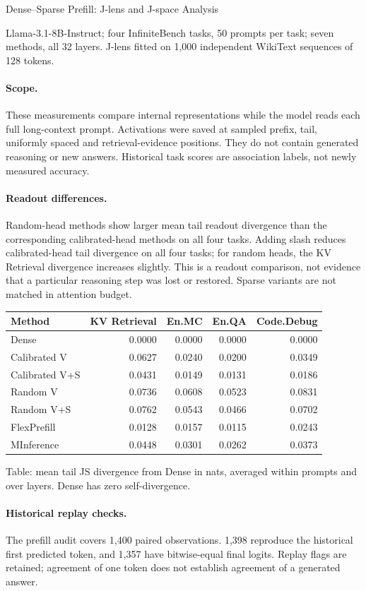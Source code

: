 \documentclass[11pt]{article}
\begin{document}
\begin{center}\Large Dense--Sparse Prefill: J-lens and J-space Analysis\end{center}
\noindent Llama-3.1-8B-Instruct; four InfiniteBench tasks, 50 prompts per task; seven methods, all 32 layers. J-lens fitted on 1,000 independent WikiText sequences of 128 tokens.
\paragraph{Scope.} These measurements compare internal representations while the model reads each full long-context prompt. Activations were saved at sampled prefix, tail, uniformly spaced and retrieval-evidence positions. They do not contain generated reasoning or new answers. Historical task scores are association labels, not newly measured accuracy.
\paragraph{Readout differences.} Random-head methods show larger mean tail readout divergence than the corresponding calibrated-head methods on all four tasks. Adding slash reduces calibrated-head tail divergence on all four tasks; for random heads, the KV Retrieval divergence increases slightly. This is a readout comparison, not evidence that a particular reasoning step was lost or restored. Sparse variants are not matched in attention budget.
\begin{center}\begin{tabular}{lrrrr}\toprule Method & KV Retrieval & En.MC & En.QA & Code.Debug\\\midrule
Dense & 0.0000 & 0.0000 & 0.0000 & 0.0000 \\
Calibrated V & 0.0627 & 0.0240 & 0.0200 & 0.0349 \\
Calibrated V+S & 0.0431 & 0.0149 & 0.0131 & 0.0186 \\
Random V & 0.0736 & 0.0608 & 0.0523 & 0.0831 \\
Random V+S & 0.0762 & 0.0543 & 0.0466 & 0.0702 \\
FlexPrefill & 0.0128 & 0.0157 & 0.0115 & 0.0243 \\
MInference & 0.0448 & 0.0301 & 0.0262 & 0.0373 \\
\bottomrule\end{tabular}\end{center}
\noindent Table: mean tail JS divergence from Dense in nats, averaged within prompts and over layers. Dense has zero self-divergence.
\paragraph{Historical replay checks.} The prefill audit covers 1,400 paired observations. 1,398 reproduce the historical first predicted token, and 1,357 have bitwise-equal final logits. Replay flags are retained; agreement of one token does not establish agreement of a generated answer.
\end{document}
